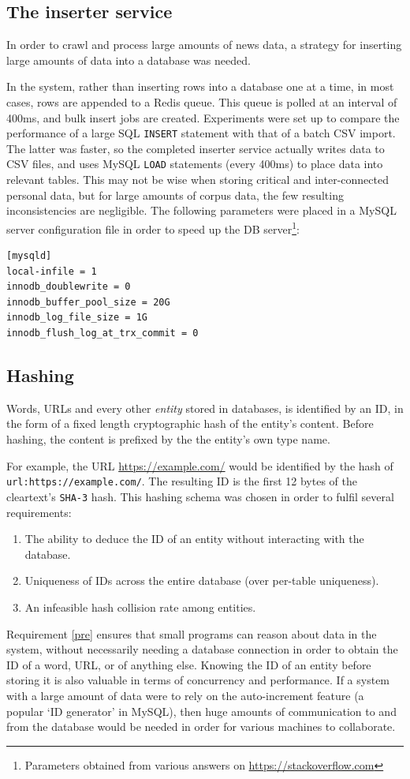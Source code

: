 \subsection{The inserter service}
In order to crawl and process large amounts of news data, a strategy
for inserting large amounts of data into a database was needed.

In the \nr{} system, rather than inserting rows into a database one
at a time,
in most cases, rows are appended to a Redis queue.  This queue is
polled at an interval of 400ms, and bulk insert jobs are
created. Experiments were set up to compare the performance
of a large SQL {\tt INSERT} statement with that of a batch CSV
import.  The latter was faster, so the completed inserter service
actually writes data to CSV files, and uses MySQL
{\tt LOAD} statements (every 400ms) to place data into relevant
tables.  This may not be wise when storing critical and inter-connected
personal data, but for large amounts of corpus data, the
few resulting inconsistencies are negligible.
The following parameters were placed in a MySQL server configuration
file in order to speed up the DB server\footnote{Parameters obtained
from various answers on \url{https://stackoverflow.com}}:
\begin{verbatim}
[mysqld]
local-infile = 1 
innodb_doublewrite = 0
innodb_buffer_pool_size = 20G
innodb_log_file_size = 1G
innodb_flush_log_at_trx_commit = 0
\end{verbatim}
\subsection{Hashing\label{hashing}}
Words, URLs and every other {\it entity} stored
in \nr{} databases, is identified by an ID, in the
form of a fixed length cryptographic hash of the entity's
content.  Before hashing, the content is prefixed by the the
entity's own type name.

For example, the URL \url{https://example.com/} would be
identified by the hash of {\tt url:https://example.com/}.
The resulting ID is the first 12 bytes of the cleartext's
{\tt SHA-3} hash.  This hashing schema was chosen in order
to fulfil several requirements:
\begin{enumerate}
    \item The ability to deduce the ID of an entity without
          interacting with the database.\label{pre}
    \item Uniqueness of IDs across the entire
          database (over per-table uniqueness).\label{uniq}
    \item An infeasible hash collision rate among entities.\label{low}
\end{enumerate}
Requirement \ref{pre} ensures that small programs 
can reason about data in the \nr{} system,
without necessarily needing a database connection in order to
obtain the ID of a word, URL, or of anything else.
Knowing the ID of an entity before storing it is also
valuable in terms of concurrency and performance.  If a system
with a large amount of data were to rely on the auto-increment
feature (a popular `ID generator' in MySQL), then
huge amounts of communication to and from the database
would be needed in order for various machines to collaborate.

